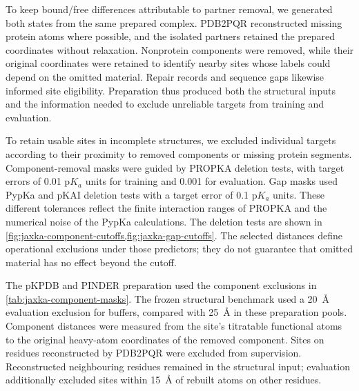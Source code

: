 To keep bound/free differences attributable to partner removal, we generated both states from the same prepared complex. PDB2PQR reconstructed missing protein atoms where possible,\supercite{dolinskyPDB2PQRExpandingUpgrading2007} and the isolated partners retained the prepared coordinates without relaxation. Nonprotein components were removed, while their original coordinates were retained to identify nearby sites whose labels could depend on the omitted material. Repair records and sequence gaps likewise informed site eligibility. Preparation thus produced both the structural inputs and the information needed to exclude unreliable targets from training and evaluation.

To retain usable sites in incomplete structures, we excluded individual targets according to their proximity to removed components or missing protein segments. Component-removal masks were guided by PROPKA deletion tests, with target errors of 0.01 $\mathrm{p}K_a$ units for training and 0.001 for evaluation. Gap masks used PypKa and pKAI deletion tests with a target error of 0.1 $\mathrm{p}K_a$ units. These different tolerances reflect the finite interaction ranges of PROPKA and the numerical noise of the PypKa calculations. The deletion tests are shown in \cref{fig:jaxka-component-cutoffs,fig:jaxka-gap-cutoffs}. The selected distances define operational exclusions under those predictors; they do not guarantee that omitted material has no effect beyond the cutoff.

The pKPDB and PINDER preparation used the component exclusions in \cref{tab:jaxka-component-masks}. The frozen structural benchmark used a 20~\AA{} evaluation exclusion for buffers, compared with 25~\AA{} in these preparation pools. Component distances were measured from the site's titratable functional atoms to the original heavy-atom coordinates of the removed component. Sites on residues reconstructed by PDB2PQR were excluded from supervision. Reconstructed neighbouring residues remained in the structural input; evaluation additionally excluded sites within 15~\AA{} of rebuilt atoms on other residues.

